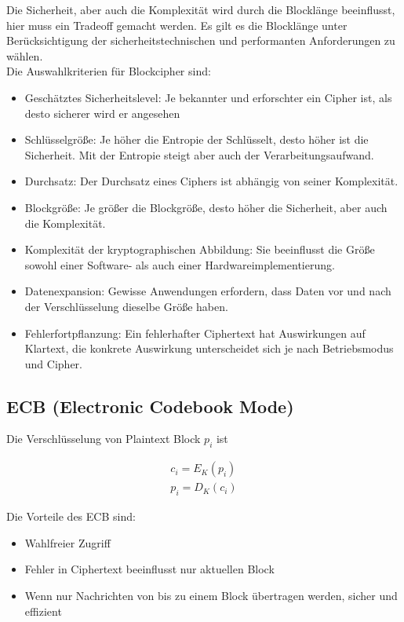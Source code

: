 Die Sicherheit, aber auch die Komplexität wird durch die Blocklänge beeinflusst, hier muss ein Tradeoff gemacht werden. Es gilt es die Blocklänge unter Berücksichtigung 
der sicherheitstechnischen und performanten Anforderungen zu wählen. \\

Die Auswahlkriterien für Blockcipher sind:

\begin{itemize}
    \item Geschätztes Sicherheitslevel: Je bekannter und erforschter ein Cipher ist, als desto sicherer wird er angesehen
    \item Schlüsselgröße: Je höher die Entropie der Schlüsselt, desto höher ist die Sicherheit. Mit der Entropie steigt aber auch der Verarbeitungsaufwand.
    \item Durchsatz: Der Durchsatz eines Ciphers ist abhängig von seiner Komplexität.
    \item Blockgröße: Je größer die Blockgröße, desto höher die Sicherheit, aber auch die Komplexität.
    \item Komplexität der kryptographischen Abbildung: Sie beeinflusst die Größe sowohl einer Software- als auch einer Hardwareimplementierung.
    \item Datenexpansion: Gewisse Anwendungen erfordern, dass Daten vor und nach der Verschlüsselung dieselbe Größe haben.
    \item Fehlerfortpflanzung: Ein fehlerhafter Ciphertext hat Auswirkungen auf Klartext, die konkrete Auswirkung unterscheidet sich je nach Betriebsmodus und Cipher.
\end{itemize}

\subsection{ECB (Electronic Codebook Mode)}

Die Verschlüsselung von Plaintext Block $p_i$ ist

\begin{align*}
    c_i = E_K(p_i) \\
    p_i = D_K(c_i)
\end{align*}

Die Vorteile des ECB sind: 

\begin{itemize}
    \item Wahlfreier Zugriff
    \item Fehler in Ciphertext beeinflusst nur aktuellen Block
    \item Wenn nur Nachrichten von bis zu einem Block übertragen werden, sicher und effizient
\end{itemize}

